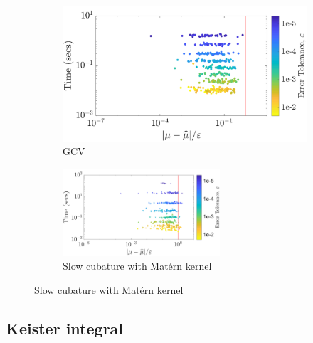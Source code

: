 \documentclass[handout, 10pt,compress,xcolor={usenames,dvipsnames}]{beamer} %
\begin{document}
{\begin{figure}[htp]
\begin{subfigure}[b]{0.48\textwidth}
			\includegraphics[width=\textwidth]{"../figures/Sobol/Sobol_MVN_guaranteed_time_GCV__d2_r1_2019-Sep-1"}
			\caption{GCV}
		\end{subfigure}
		\centering
		\begin{subfigure}[b]{0.48\textwidth}
			\includegraphics[height=3.25cm]{../figures/MVN_guaranteed_time_Matern_d2_2019-Jun-29}
			\caption{Slow cubature with Mat\'ern  kernel}
		\end{subfigure}	
	\end{figure}
}





\subsection{Keister integral}
\end{document}
